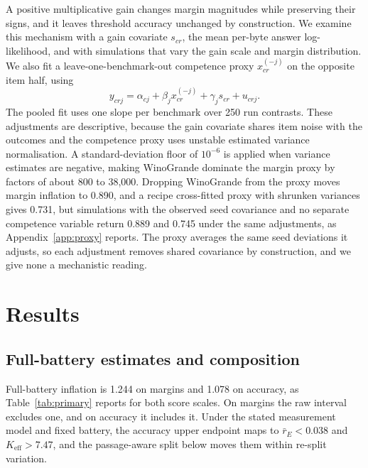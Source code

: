 \documentclass{article}
\begin{document}
A positive multiplicative gain changes margin magnitudes while preserving their signs, and it leaves threshold accuracy unchanged by construction. We examine this mechanism with a gain covariate $s_{cr}$, the mean per-byte answer log-likelihood, and with simulations that vary the gain scale and margin distribution. We also fit a leave-one-benchmark-out competence proxy $x_{cr}^{(-j)}$ on the opposite item half, using
\begin{equation}
y_{crj}=\alpha_{cj}+\beta_jx_{cr}^{(-j)}+\gamma_js_{cr}+u_{crj}.
\end{equation}
The pooled fit uses one slope per benchmark over 250 run contrasts. These adjustments are descriptive, because the gain covariate shares item noise with the outcomes and the competence proxy uses unstable estimated variance normalisation. A standard-deviation floor of $10^{-6}$ is applied when variance estimates are negative, making WinoGrande dominate the margin proxy by factors of about 800 to 38,000. Dropping WinoGrande from the proxy moves margin inflation to 0.890, and a recipe cross-fitted proxy with shrunken variances gives 0.731, but simulations with the observed seed covariance and no separate competence variable return 0.889 and 0.745 under the same adjustments, as Appendix~\ref{app:proxy} reports. The proxy averages the same seed deviations it adjusts, so each adjustment removes shared covariance by construction, and we give none a mechanistic reading.

\section{Results}
\subsection{Full-battery estimates and composition}
\label{sec:composition}
Full-battery inflation is 1.244 on margins and 1.078 on accuracy, as Table~\ref{tab:primary} reports for both score scales. On margins the raw interval excludes one, and on accuracy it includes it. Under the stated measurement model and fixed battery, the accuracy upper endpoint maps to $\bar r_E<0.038$ and $K_{\mathrm{eff}}>7.47$, and the passage-aware split below moves them within re-split variation.
\end{document}
